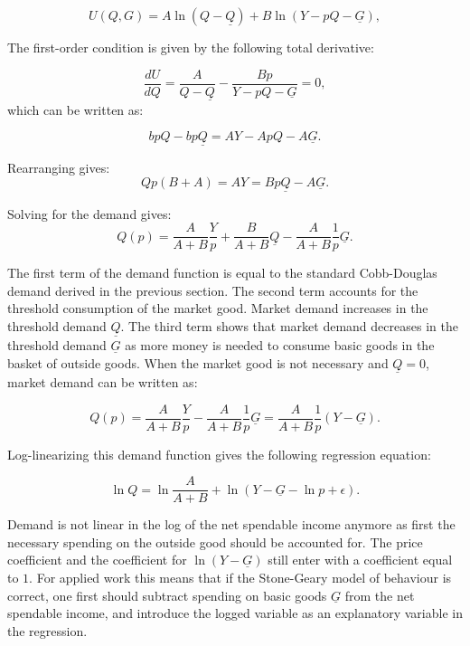 \documentclass[
]{book}
\begin{document}
\begin{equation}
U(Q,G) = A \ln (Q - \underline{Q}) + B \ln (Y - p Q - \underline{G}),
\end{equation}

The first-order condition is given by the following total derivative:

\begin{equation}
\frac{d U }{d Q} = \frac{A}{Q - \underline{Q}} - \frac{B p}{Y - pQ - \underline{G}} = 0, 
\end{equation}
which can be written as:

\begin{equation}
bpQ - bp\underline{Q} = AY - ApQ - A\underline{G}. 
\end{equation}

Rearranging gives:
\begin{equation}
Qp(B+ A) = AY = Bp\underline{Q} - A\underline{G}.
\end{equation}

Solving for the demand gives:
\begin{equation}
Q(p) = \frac{A}{A+B}\frac{Y}{p} + \frac{B}{A+B}\underline{Q} - \frac{A}{A+B}\frac{1}{p}\underline{G}.
\end{equation}

The first term of the demand function is equal to the standard Cobb-Douglas demand derived in the previous section. The second term accounts for the threshold consumption of the market good. Market demand increases in the threshold demand \(\underline{Q}\). The third term shows that market demand decreases in the threshold demand \(\underline{G}\) as more money is needed to consume basic goods in the basket of outside goods. When the market good is not necessary and \(\underline{Q} = 0\), market demand can be written as:

\begin{equation}
Q(p) = \frac{A}{A+B}\frac{Y}{p} - \frac{A}{A+B}\frac{1}{p}\underline{G} = \frac{A}{A+B}\frac{1}{p}\left(Y - \underline{G} \right).
\end{equation}

Log-linearizing this demand function gives the following regression equation:

\begin{equation}
\ln Q = \ln \frac{A}{A+B} + \ln(Y - \underline{G} - \ln p + \epsilon).
\end{equation}

Demand is not linear in the log of the net spendable income anymore as first the necessary spending on the outside good should be accounted for. The price coefficient and the coefficient for \(\ln (Y - \underline{G})\) still enter with a coefficient equal to \(1\). For applied work this means that if the Stone-Geary model of behaviour is correct, one first should subtract spending on basic goods \(\underline{G}\) from the net spendable income, and introduce the logged variable as an explanatory variable in the regression.
\end{document}

